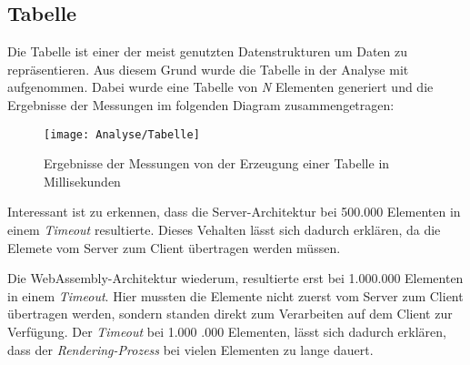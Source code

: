 \subsection{Tabelle}
\label{subsec:table}
Die Tabelle ist einer der meist genutzten Datenstrukturen um Daten zu repräsentieren. Aus diesem
Grund wurde die Tabelle in der Analyse mit aufgenommen. Dabei wurde eine Tabelle von
\emph{N} Elementen generiert und die Ergebnisse der Messungen im folgenden Diagram zusammengetragen:

\begin{figure}[h]
    \centering
    \texttt{[image: Analyse/Tabelle]}
    \caption[Ergebnisse der Messungen von der Erzeugung einer Tabelle in Millisekunden]{Ergebnisse
    der Messungen von der Erzeugung einer Tabelle in Millisekunden}
    \label{img:table}
\end{figure}

Interessant ist zu erkennen, dass die Server-Architektur bei 500.000 Elementen in einem
\emph{Timeout} resultierte. Dieses Vehalten lässt sich dadurch erklären, da die Elemete vom
Server zum Client übertragen werden müssen.

Die WebAssembly-Architektur wiederum, resultierte erst bei 1.000.000 Elementen in einem
\emph{Timeout}. Hier mussten die Elemente nicht zuerst vom Server zum Client übertragen werden,
sondern standen direkt zum Verarbeiten auf dem Client zur Verfügung. Der \emph{Timeout} bei 1.000
.000 Elementen, lässt sich dadurch erklären, dass der \emph{Rendering-Prozess} bei vielen
Elementen zu lange dauert.
